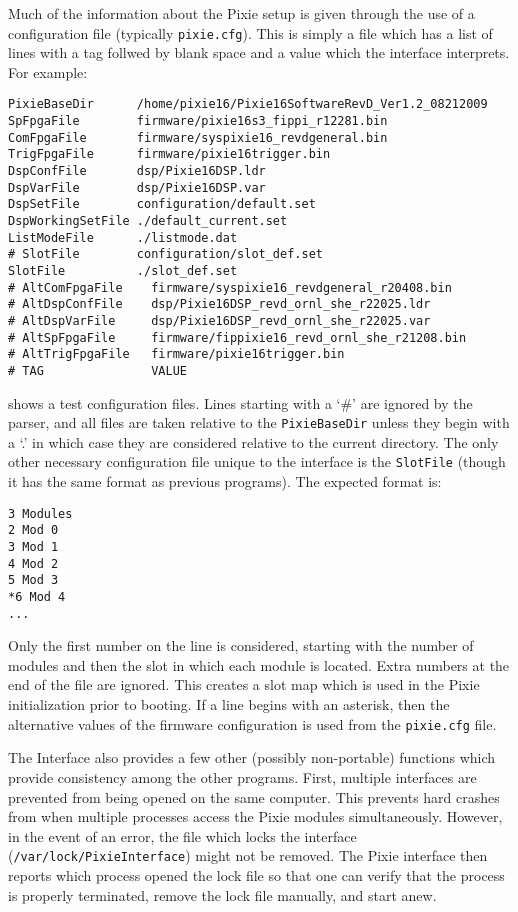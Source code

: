 \documentclass[10pt]{article}
\begin{document}
Much of the information about the Pixie setup is given through the use of a 
configuration file (typically \texttt{pixie.cfg}). This is simply a file which 
has a list of lines with a tag follwed by blank space and a value which the 
interface interprets. For example:
\begin{verbatim}
PixieBaseDir      /home/pixie16/Pixie16SoftwareRevD_Ver1.2_08212009
SpFpgaFile        firmware/pixie16s3_fippi_r12281.bin
ComFpgaFile       firmware/syspixie16_revdgeneral.bin
TrigFpgaFile      firmware/pixie16trigger.bin
DspConfFile       dsp/Pixie16DSP.ldr
DspVarFile        dsp/Pixie16DSP.var
DspSetFile        configuration/default.set
DspWorkingSetFile ./default_current.set
ListModeFile      ./listmode.dat
# SlotFile        configuration/slot_def.set
SlotFile          ./slot_def.set
# AltComFpgaFile    firmware/syspixie16_revdgeneral_r20408.bin
# AltDspConfFile    dsp/Pixie16DSP_revd_ornl_she_r22025.ldr
# AltDspVarFile     dsp/Pixie16DSP_revd_ornl_she_r22025.var
# AltSpFpgaFile     firmware/fippixie16_revd_ornl_she_r21208.bin
# AltTrigFpgaFile   firmware/pixie16trigger.bin
# TAG               VALUE

\end{verbatim}
shows a test configuration files. Lines starting with a `\#' are ignored by the 
parser, and all files are taken relative to the \texttt{PixieBaseDir} unless 
they begin with a `.' in which case they are considered relative to the current 
directory. The only other necessary configuration file unique to the interface 
is the \texttt{SlotFile} (though it has the same format as previous programs). 
The expected format is:
\begin{verbatim}
3 Modules
2 Mod 0 
3 Mod 1
4 Mod 2
5 Mod 3
*6 Mod 4
...
\end{verbatim}
Only the first number on the line is considered, starting with the number of
modules and then the slot in which each module is located. Extra numbers at
the end of the file are ignored. This creates a slot map which is used in the
Pixie initialization prior to booting. If a line begins with an asterisk, then
the alternative values of the firmware configuration is used from the
\texttt{pixie.cfg} file.

The Interface also provides a few other (possibly non-portable) functions which 
provide consistency among the other programs. First, multiple interfaces are 
prevented from being opened on the same computer. This prevents hard crashes 
from when multiple processes access the Pixie modules simultaneously. However, 
in the event of an error, the file which locks the interface 
(\texttt{/var/lock/PixieInterface}) might not be removed. The Pixie interface 
then reports which process opened the lock file so that one can verify that the 
process is properly terminated, remove the lock file manually, and start anew.
\end{document}
